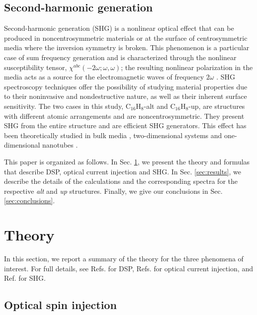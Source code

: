\documentclass[pss]{wiley2sp} %
\begin{document}
\subsection{Second-harmonic generation}

Second-harmonic generation (SHG) is a nonlinear optical effect that can be
produced in noncentrosymmetric materials or at the surface of centrosymmetric
media where the inversion symmetry is broken. This phenomenon is a particular
case of sum frequency generation and is characterized through the nonlinear
susceptibility tensor, $\chi^{abc}(-2\omega;\omega,\omega)$; the resulting
nonlinear polarization in the media acts as a source for the electromagnetic
waves of frequency $2\omega$ \cite{loudonOUP00}. SHG spectroscopy techniques
offer the possibility of studying material properties due to their noninvasive
and nondestructive nature, as well as their inherent surface sensitivity. The two cases in
this study, C$_{16}$H$_{8}$-alt and C$_{16}$H$_{8}$-up, are structures with
different atomic arrangements and are noncentrosymmetric. They present SHG
from the entire structure and are efficient SHG generators. This effect has
been theoretically studied in bulk media \cite{andersonPRB15,figliozziPRL05},
two-dimensional systems \cite{mendozaPRB97,niAPL03} and one-dimensional
nanotubes \cite{salazarPRB14,guoPRB05}.

This paper is organized as follows. In Sec. \ref{sec:theory}, we present the
theory and formulas that describe DSP, optical current injection and SHG.
In Sec. \ref{sec:results}, we describe the details of the calculations and the
corresponding spectra for the respective \emph{alt} and \emph{up} structures.
Finally, we give our conclusions in Sec. \ref{sec:conclusions}.


\section{Theory}\label{sec:theory}

In this section, we report a summary of the theory for the three phenomena of
interest. For full details, see Refs. \cite{nastosPRB07,mendozaPRB12} for DSP,
Refs. \cite{cabellosPRB11,sipePRB00} for optical current injection, and Ref.
\cite{andersonPRB15} for SHG. 


\subsection{Optical spin injection}\label{sec:theory-DSP}
\end{document}

